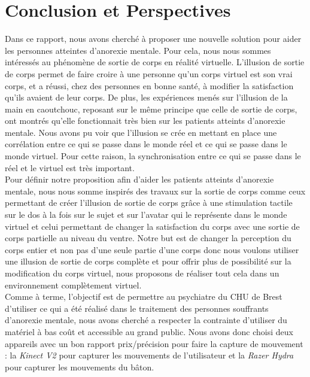 \documentclass[11pt]{article}
\begin{document}
\section{Conclusion et Perspectives}
Dans ce rapport, nous avons cherché à proposer une nouvelle solution pour aider les personnes atteintes d'anorexie mentale. Pour cela, nous nous sommes intéressés au phénomène de sortie de corps en réalité virtuelle. L'illusion de sortie de corps permet de faire croire à une personne qu'un corps virtuel est son vrai corps, et a réussi, chez des personnes en bonne santé, à modifier la satisfaction qu'ils avaient de leur corps. De plus, les expériences menés sur l'illusion de la main en caoutchouc, reposant sur le même principe que celle de sortie de corps, ont montrés qu'elle fonctionnait très bien sur les patients atteints d'anorexie mentale. Nous avons pu voir que l'illusion se crée en mettant en place une corrélation entre ce qui se passe dans le monde réel et ce qui se passe dans le monde virtuel. Pour cette raison, la synchronisation entre ce qui se passe dans le réel et le virtuel est très important.\\

Pour définir notre proposition afin d'aider les patients atteints d'anorexie mentale, nous nous somme inspirés des travaux sur la sortie de corps comme ceux permettant de créer l'illusion de sortie de corps grâce à une stimulation tactile sur le dos à la fois sur le sujet et sur l'avatar qui le représente dans le monde virtuel et celui permettant de changer la satisfaction du corps avec une sortie de corps partielle au niveau du ventre. Notre but est de changer la perception du corps entier et non pas d'une seule partie d'une corps donc nous voulons utiliser une illusion de sortie de corps complète et pour offrir plus de possibilité sur la modification du corps virtuel, nous proposons de réaliser tout cela dans un environnement complètement virtuel.\\

Comme à terme, l'objectif est de permettre au psychiatre du CHU de Brest d'utiliser ce qui a été réalisé dans le traitement des personnes souffrants d'anorexie mentale, nous avons cherché a respecter la contrainte d'utiliser du matériel à bas coût et accessible au grand public. Nous avons donc choisi deux appareils avec un bon rapport prix/précision pour faire la capture de mouvement : la \emph{Kinect V2} pour capturer les mouvements de l'utilisateur et la \emph{Razer Hydra} pour capturer les mouvements du bâton.\\
\end{document}
